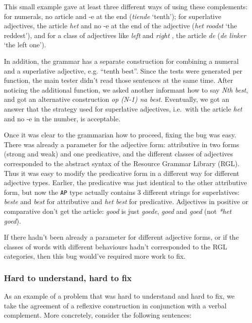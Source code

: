 This small example gave at least three different ways of using these
complements: for numerals, no article and -e at the end (\emph{tiende}
`tenth'); for superlative adjectives, the article \emph{het} and no -e
at the end of the adjective (\emph{het roodst} `the reddest'), and for
a class of adjectives like \emph{left} and \emph{right} , the article \emph{de} (\emph{de linker} `the left
one').

In addition, the grammar has a separate construction for combining a
numeral and a superlative adjective, e.g. ``tenth best''. Since the
tests were generated per function, the main tester didn't read those
sentences at the same time. After noticing the additional function, we
asked another informant how to say \emph{Nth best}, and got an
alternative construction \emph{op (N-1) na best}. Eventually, we got an
answer that the strategy used for superlative adjectives, i.e.~with the
article \emph{het} and no -e in the number, is acceptable.

Once it was clear to the grammarian how to proceed, fixing the bug was
easy. There was already a parameter for the adjective form: attributive
in two forms (strong and weak) and one predicative, and the different
classes of adjectives corresponded to the abstract syntax of the \gf{}
Resource Grammar Library (RGL).
Thus it was easy to modify the predicative form in a different way for
different adjective types. Earlier, the predicative was just identical
to the other attributive form, but now the \texttt{AP} type actually
contains 3 different strings for superlatives: \emph{beste} and
\emph{best} for attributive and \emph{het best} for predicative.
Adjectives in positive or comparative don't get the article: \emph{good}
is just \emph{goede}, \emph{goed} and \emph{goed} (not \emph{*het
goed}).

If there hadn't been already a parameter for different adjective forms,
or if the classes of words with different behaviours hadn't corresponded
to the RGL categories, then this bug would've required more work to fix.

\subsubsection{Hard to understand, hard to
fix}\label{hard-to-understand-hard-to-fix}

As an example of a problem that was hard to understand and hard to fix,
we take the agreement of a reflexive construction in conjunction with a
verbal complement. More concretely, consider the following sentences:

